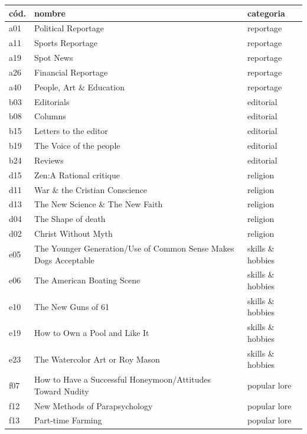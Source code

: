 \documentclass[12pt,letterpaper,twoside]{article}
\begin{document}
    \begin{longtable}[c]{| p{} | p{} | p{}|} 
    \hline
        cód.  & nombre  & categoria  \\ \hline
        a01 & Political Reportage & reportage  \\ \hline
        a11 & Sports Reportage & reportage  \\ \hline
        a19 & Spot News & reportage  \\ \hline
        a26 & Financial Reportage & reportage  \\ \hline
        a40 & People, Art \& Education & reportage \\ \hline
        b03 & Editorials & editorial  \\ \hline
        b08 & Columns & editorial  \\ \hline
        b15 & Letters to the editor & editorial  \\ \hline
        b19 & The Voice of the people & editorial \\ \hline
        b24 & Reviews & editorial \\ \hline
        d15 & Zen:A Rational critique & religion  \\ \hline
        d11 & War \& the Cristian Conscience & religion  \\ \hline
        d13 & The New Science \& The New Faith & religion  \\ \hline
        d04 & The Shape of death & religion  \\ \hline
        d02 & Christ Without Myth & religion  \\ \hline
        e05 & The Younger Generation/Use of Common Sense Makes Dogs Acceptable & skills \& hobbies \\ \hline
        e06 & The American Boating Scene & skills \& hobbies  \\ \hline
        e10 & The New Guns of 61 & skills \& hobbies  \\ \hline
        e19 & How to Own a Pool and Like It & skills \& hobbies  \\ \hline
        e23 & The Watercolor Art or Roy Mason & skills \& hobbies  \\ \hline
        f07 & How to Have a Successful Honeymoon/Attitudes Toward Nudity & popular lore  \\ \hline
        f12 & New Methods of Parapsychology & popular lore  \\ \hline
        f13 & Part-time Farming & popular lore  \\ \hline

\end{longtable}
\end{document}
